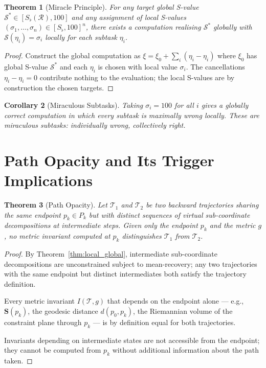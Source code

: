 \documentclass[twocolumn,10pt,a4paper]{article}
\theoremstyle{thmstyle}
\newtheorem{theorem}{Theorem}[section]
\newtheorem{corollary}[theorem]{Corollary}
\theoremstyle{definition}
\theoremstyle{remark}
\newcommand{\Sfl}{S_{\flat}}
\newcommand{\Svec}{\mathbf{S}}
\newcommand{\receiver}{\mathcal{R}}
\begin{document}
\begin{theorem}[Miracle Principle]
\label{thm:miracle}
For any target global S-value $\mathcal{S}^* \in [\Sfl(\receiver), 100]$
and any assignment of local S-values $(\sigma_1, \ldots, \sigma_n) \in
[\Sfl, 100]^n$, there exists a computation realising $\mathcal{S}^*$ globally
with $\mathcal{S}(\eta_i) = \sigma_i$ locally for each subtask $\eta_i$.
\end{theorem}

\begin{proof}
Construct the global computation as $\xi = \xi_0 + \sum_i (\eta_i - \eta_i)$
where $\xi_0$ has global S-value $\mathcal{S}^*$ and each $\eta_i$ is chosen
with local value $\sigma_i$. The cancellations $\eta_i - \eta_i = 0$
contribute nothing to the evaluation; the local S-values are by construction
the chosen targets.
\end{proof}

\begin{corollary}[Miraculous Subtasks]
Taking $\sigma_i = 100$ for all $i$ gives a globally correct computation
in which every subtask is maximally wrong locally. These are \emph{miraculous
subtasks}: individually wrong, collectively right.
\end{corollary}

\section{Path Opacity and Its Trigger Implications}
\label{sec:opacity}

\begin{theorem}[Path Opacity]
\label{thm:path_opacity}
Let $\mathcal{T}_1$ and $\mathcal{T}_2$ be two backward trajectories
sharing the same endpoint $p_k \in P_k$ but with distinct sequences of
virtual sub-coordinate decompositions at intermediate steps.
Given only the endpoint $p_k$ and the metric $g$, no metric invariant
computed at $p_k$ distinguishes $\mathcal{T}_1$ from $\mathcal{T}_2$.
\end{theorem}

\begin{proof}
By Theorem~\ref{thm:local_global}, intermediate sub-coordinate decompositions
are unconstrained subject to mean-recovery; any two trajectories with the
same endpoint but distinct intermediates both satisfy the trajectory
definition.

Every metric invariant $I(\mathcal{T}, g)$ that depends on the endpoint alone —
e.g., $\Svec(p_k)$, the geodesic distance $d(p_0, p_k)$, the Riemannian
volume of the constraint plane through $p_k$ — is by definition equal for
both trajectories.

Invariants depending on intermediate states are not accessible from the
endpoint; they cannot be computed from $p_k$ without additional information
about the path taken.
\end{proof}
\end{document}

